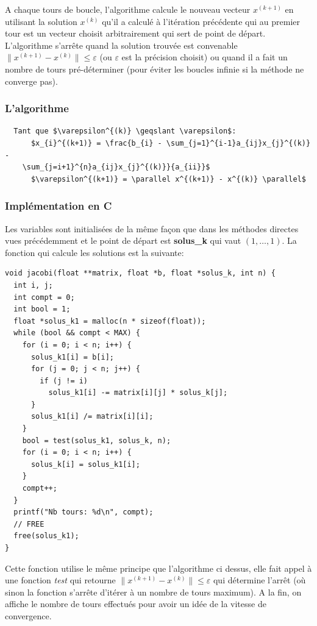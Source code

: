 \documentclass[a4paper]{article}
\begin{document}
A chaque tours de boucle, l'algorithme calcule le nouveau vecteur $x^{(k+1)}$ en
utilisant la solution $x^{(k)}$ qu'il a calculé à l'itération précédente qui au
premier tour est un vecteur choisit arbitrairement qui sert de point de
départ. L'algorithme s'arrête quand la solution trouvée est convenable
$\parallel x^{(k+1)} - x^{(k)} \parallel \leqslant \varepsilon$ (ou
$\varepsilon$ est la précision choisit) ou quand il a fait un nombre de tours
pré-déterminer (pour éviter les boucles infinie si la méthode ne converge pas).

\subsubsection{L'algorithme}

\begin{lstlisting}
  Tant que $\varepsilon^{(k)} \geqslant \varepsilon$:
      $x_{i}^{(k+1)} = \frac{b_{i} - \sum_{j=1}^{i-1}a_{ij}x_{j}^{(k)} -
    \sum_{j=i+1}^{n}a_{ij}x_{j}^{(k)}}{a_{ii}}$
      $\varepsilon^{(k+1)} = \parallel x^{(k+1)} - x^{(k)} \parallel$
\end{lstlisting}

\subsubsection{Implémentation en C}

Les variables sont initialisées de la même façon que dans les méthodes directes
vues précédemment et le point de départ est \textbf{solus\_k} qui vaut $(1,
\dots, 1)$. La fonction qui calcule les solutions est la suivante:

\begin{lstlisting}
void jacobi(float **matrix, float *b, float *solus_k, int n) {
  int i, j;
  int compt = 0;
  int bool = 1;
  float *solus_k1 = malloc(n * sizeof(float));
  while (bool && compt < MAX) {
    for (i = 0; i < n; i++) {
      solus_k1[i] = b[i];
      for (j = 0; j < n; j++) {
        if (j != i)
          solus_k1[i] -= matrix[i][j] * solus_k[j];
      }
      solus_k1[i] /= matrix[i][i];
    }
    bool = test(solus_k1, solus_k, n);
    for (i = 0; i < n; i++) {
      solus_k[i] = solus_k1[i];
    }
    compt++;
  }
  printf("Nb tours: %d\n", compt);
  // FREE
  free(solus_k1);
}
\end{lstlisting}

Cette fonction utilise le même principe que l'algorithme ci dessus, elle
fait appel à une fonction \textit{test} qui retourne $\parallel x^{(k+1)} -
x^{(k)} \parallel \leqslant \varepsilon$ qui détermine l'arrêt (où sinon la
fonction s'arrête d'itérer à un nombre de tours maximum). A la fin, on affiche
le nombre de tours effectués pour avoir un idée de la vitesse de convergence.
\end{document}
